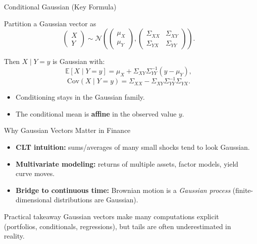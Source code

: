 \documentclass[10pt,aspectratio=169]{beamer}
\begin{document}
\begin{frame}{Conditional Gaussian (Key Formula)}

Partition a Gaussian vector as
\[
\begin{pmatrix} X \\ Y \end{pmatrix}
\sim \mathcal{N}\!\left(
\begin{pmatrix} \mu_X \\ \mu_Y \end{pmatrix},
\begin{pmatrix}
\Sigma_{XX} & \Sigma_{XY}\\
\Sigma_{YX} & \Sigma_{YY}
\end{pmatrix}
\right).
\]\pause

\medskip
Then \(X\mid Y=y\) is Gaussian with:\pause
\[
\mathbb{E}[X\mid Y=y]
=
\mu_X + \Sigma_{XY}\Sigma_{YY}^{-1}(y-\mu_Y),
\]
\[
\mathrm{Cov}(X\mid Y=y)
=
\Sigma_{XX}-\Sigma_{XY}\Sigma_{YY}^{-1}\Sigma_{YX}.
\]
\pause

\begin{itemize}
  \item Conditioning stays in the Gaussian family.\pause
  \item The conditional mean is \textbf{affine} in the observed value \(y\).
\end{itemize}

\end{frame}

\begin{frame}{Why Gaussian Vectors Matter in Finance}

\begin{itemize}
  \item \textbf{CLT intuition:} sums/averages of many small shocks tend to look Gaussian.\pause
  \item \textbf{Multivariate modeling:} returns of multiple assets, factor models, yield curve moves.\pause
  \item \textbf{Bridge to continuous time:} Brownian motion is a \emph{Gaussian process} (finite-dimensional distributions are Gaussian).\pause
\end{itemize}

\medskip
\begin{block}{Practical takeaway}
Gaussian vectors make many computations explicit (portfolios, conditionals, regressions), but tails are often underestimated in reality.
\end{block}

\end{frame}
\end{document}
